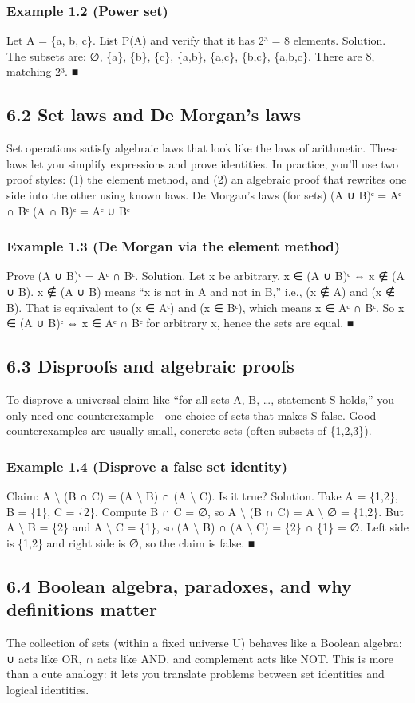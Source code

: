 \documentclass[11pt]{article}
\begin{document}
\subsubsection*{Example 1.2 (Power set)}
Let A = \{a, b, c\}. List P(A) and verify that it has 2³ = 8 elements.
Solution. The subsets are: ∅, \{a\}, \{b\}, \{c\}, \{a,b\}, \{a,c\}, \{b,c\}, \{a,b,c\}. There are
8, matching 2³. ■
\subsection{6.2 Set laws and De Morgan’s laws}
Set operations satisfy algebraic laws that look like the laws of arithmetic. These laws let
you simplify expressions and prove identities. In practice, you’ll use two proof styles: (1)
the element method, and (2) an algebraic proof that rewrites one side into the other using
known laws.
De Morgan’s laws (for sets)
(A ∪ B)ᶜ = Aᶜ ∩ Bᶜ
(A ∩ B)ᶜ = Aᶜ ∪ Bᶜ

\subsubsection*{Example 1.3 (De Morgan via the element method)}
Prove (A ∪ B)ᶜ = Aᶜ ∩ Bᶜ.
Solution. Let x be arbitrary.
x ∈ (A ∪ B)ᶜ ⇔ x ∉ (A ∪ B).
x ∉ (A ∪ B) means “x is not in A and not in B,” i.e., (x ∉ A) and (x ∉ B).
That is equivalent to (x ∈ Aᶜ) and (x ∈ Bᶜ), which means x ∈ Aᶜ ∩ Bᶜ.
So x ∈ (A ∪ B)ᶜ ⇔ x ∈ Aᶜ ∩ Bᶜ for arbitrary x, hence the sets are equal. ■
\subsection{6.3 Disproofs and algebraic proofs}
To disprove a universal claim like “for all sets A, B, …, statement S holds,” you only need
one counterexample—one choice of sets that makes S false. Good counterexamples are
usually small, concrete sets (often subsets of \{1,2,3\}).
\subsubsection*{Example 1.4 (Disprove a false set identity)}
Claim: A \(\setminus\) (B ∩ C) = (A \(\setminus\) B) ∩ (A \(\setminus\) C). Is it true?
Solution. Take A = \{1,2\}, B = \{1\}, C = \{2\}.
Compute B ∩ C = ∅, so A \(\setminus\) (B ∩ C) = A \(\setminus\) ∅ = \{1,2\}.
But A \(\setminus\) B = \{2\} and A \(\setminus\) C = \{1\}, so (A \(\setminus\) B) ∩ (A \(\setminus\) C) = \{2\} ∩ \{1\} = ∅.
Left side is \{1,2\} and right side is ∅, so the claim is false. ■
\subsection{6.4 Boolean algebra, paradoxes, and why definitions matter}
The collection of sets (within a fixed universe U) behaves like a Boolean algebra: ∪ acts
like OR, ∩ acts like AND, and complement acts like NOT. This is more than a cute analogy:
it lets you translate problems between set identities and logical identities.
\end{document}
